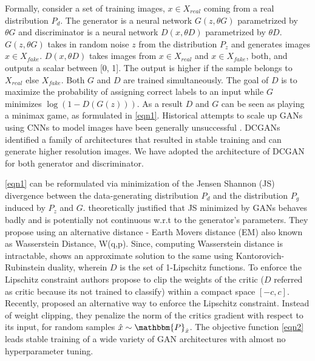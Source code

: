 \documentclass{article}
\newcommand{\squeezeup}{\vspace{-2.5mm}}
\begin{document}
Formally, consider a set of training images, \( x \in X_{real} \) coming from a real distribution \(P_{d}\). The generator is a neural network \(G (z,\theta G) \) parametrized by \(\theta G\) and discriminator is a neural network \(D(x,\theta D)\) parametrized by \(\theta D\). \(G (z,\theta G) \) takes in random noise \(z\) from the distribution \(P_{z}\) and generates images \( x \in X_{fake} \). \(D(x,\theta D)\) takes images from \( x \in X_{real} \) and \( x \in X_{fake} \), both, and outputs a scalar between [0, 1]. The output is higher if the sample belongs to \(X_{real}\) else \(X_{fake}\). Both $G$ and $D$ are trained simultaneously. The goal of $D$ is to maximize the probability of assigning correct labels to an input while $G$ minimizes \( \log ⁡(1-D(G(z)))\). As a result $D$ and $G$ can be seen as playing a minimax game, as formulated in \ref{eqn1}. Historical attempts to scale up GANs using CNNs to model images have been generally unsuccessful \cite{NIPS2014_5423}. DCGANs \cite{DBLP:journals/corr/RadfordMC15} identified a family of architectures that resulted in stable training and can generate higher resolution images. We have adopted the architecture of DCGAN for both generator and discriminator.\par
\ref{eqn1} can be reformulated via minimization of the Jensen Shannon (JS) divergence between the data-generating distribution \(P_{d}\) and the distribution \(P_{g}\) induced by \(P_{z}\) and $G$. \cite{2017arXiv170107875A} theoretically justified that JS minimized by GANs behaves badly and is potentially not continuous w.r.t to the generator’s parameters. They propose using an alternative distance - Earth Mover\textquotesingle s distance (EM) also known as Wasserstein Distance, W(q,p). Since, computing Wasserstein distance is intractable, \cite{2017arXiv170107875A} shows an approximate solution to the same using Kantorovich-Rubinstein duality, wherein $D$ is the set of 1-Lipschitz functions. To enforce the Lipschitz constraint authors propose to clip the weights of the critic ($D$ referred as critic because it\textquotesingle s not trained to classify) within a compact space $[-c, c]$. Recently, \cite{DBLP:journals/corr/GulrajaniAADC17} proposed an alternative way to enforce the Lipschitz constraint. Instead of weight clipping, they penalize the norm of the critic\textquotesingle s gradient with respect to its input, for random samples \(\hat{x} \sim \mathbbm{P}_{\hat{x}}\). The objective function \ref{eqn2} leads stable training of a wide variety of GAN architectures with almost no hyperparameter tuning. \par
\squeezeup
\squeezeup
\end{document}
